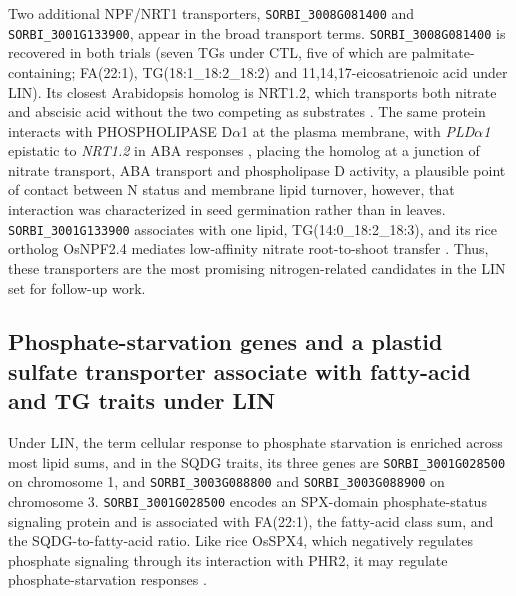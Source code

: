 \documentclass[9pt,twocolumn,twoside]{rilabRxiv}
\begin{document}
Two additional NPF/NRT1 transporters, \texttt{SORBI\_3008G081400} and \texttt{SORBI\_3001G133900}, appear in the broad transport terms. \texttt{SORBI\_3008G081400} is recovered in both trials (seven TGs under CTL, five of which are palmitate-containing; FA(22:1), TG(18:1\_18:2\_18:2) and 11,14,17-eicosatrienoic acid under LIN). Its closest Arabidopsis homolog is NRT1.2, which transports both nitrate and abscisic acid without the two competing as substrates \citep{Kanno2013NPF46}. The same protein interacts with PHOSPHOLIPASE D$\alpha$1 at the plasma membrane, with \textit{PLD$\alpha$1} epistatic to \textit{NRT1.2} in ABA responses \citep{Li2020NRT12PLD}, placing the homolog at a junction of nitrate transport, ABA transport and phospholipase D activity, a plausible point of contact between N status and membrane lipid turnover, however, that interaction was characterized in seed germination rather than in leaves. \texttt{SORBI\_3001G133900} associates with one lipid, TG(14:0\_18:2\_18:3), and its rice ortholog OsNPF2.4 mediates low-affinity nitrate root-to-shoot transfer \citep{Xia2015NPF24}. Thus, these transporters are the most promising nitrogen-related candidates in the LIN set for follow-up work.

\subsection*{Phosphate-starvation genes and a plastid sulfate transporter associate with fatty-acid and TG traits under LIN}

Under LIN, the term cellular response to phosphate starvation is enriched across most lipid sums, and in the SQDG traits, its three genes are \texttt{SORBI\_3001G028500} on chromosome 1, and \texttt{SORBI\_3003G088800} and \texttt{SORBI\_3003G088900} on chromosome 3. \texttt{SORBI\_3001G028500} encodes an SPX-domain phosphate-status signaling protein and is associated with FA(22:1), the fatty-acid class sum, and the SQDG-to-fatty-acid ratio. Like rice OsSPX4, which negatively regulates phosphate signaling through its interaction with PHR2, it may regulate phosphate-starvation responses \citep{Lv2014SPX4}.
\end{document}
